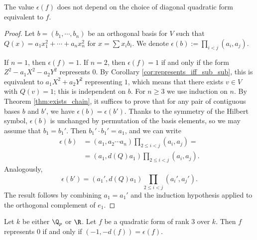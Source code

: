 \begin{lemma}\label{lem:HM_inv_well_defined}
\leanok
The value $\epsilon(f)$ does not depend on the choice of diagonal quadratic form equivalent to $f$.
\end{lemma}
\begin{proof}
Let $b = (b_1, \cdots, b_n)$ be an orthogonal basis for $V$ such that $Q(x) = a_1 x_1^2 + \cdots + a_n x_n^2$ for $x = \sum x_i b_i$. We denote  $\epsilon(b) := \prod_{i < j}(a_i, a_j)$. 

If $n=1$, then $\epsilon(f) = 1$. If $n=2$, then $\epsilon(f) = 1$ if and only if the form $Z^2 - a_1 X^2 - a_2 Y^2$ represents $0$. By Corollary \ref{cor:represents_iff_sub_sub}, this is equivalent to $a_1 X^2 + a_2 Y^2$ representing $1$, which means that there exists $v \in V$ with $Q(v) = 1$; this is independent on $b$. 
For $n \ge 3$ we use induction on $n$. By Theorem \ref{thm:exists_chain}, it suffices to prove that for any pair of contiguous bases $b$ and $b'$, we have $\epsilon(b) = \epsilon(b')$. 
Thanks to the symmetry of the Hilbert symbol, $\epsilon(b)$ is unchanged by permutation of the basis elements, so we may assume that $b_1 = b_1'$.
Then $b_1' \cdot b_1' = a_1$, and we can write 
\begin{align*}
	\epsilon(b) &= (a_1, a_2 \cdots a_n) \prod_{2 \le i < j} (a_i, a_j) = \\
	&= (a_1, d(Q) a_1) \prod_{2 \le i < j} (a_i, a_j).
\end{align*}
Analogously, \[\epsilon(b') = (a_1', d(Q) a_1) \prod_{2 \le i < j} (a_i', a_j'). \]
The result follows by combining $a_1 = a_1'$ and the induction hypothesis applied to the orthogonal complement of $e_1$.
\end{proof}

\begin{lemma}\label{lem:represents_zero_iff_rk_3}
\leanok
{}
Let $k$ be either $\Q_p$ or $\R$. Let $f$ be a quadratic form of rank $3$ over $k$. Then $f$ represents $0$ if and only if $(-1, -d(f)) = \epsilon(f)$.
\end{lemma}

